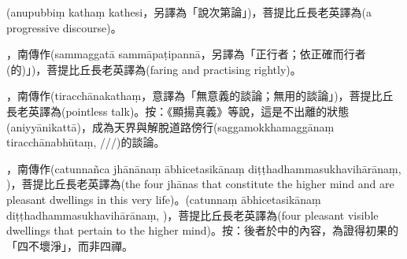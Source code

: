 \startitemgroup[noteitems]
\item{}(anupubbiṃ kathaṃ kathesi，另譯為「說次第論」)，菩提比丘長老英譯為(a progressive discourse)。
\stopitemgroup

\startitemgroup[noteitems]
\item{}，南傳作(sammaggatā sammāpaṭipannā，另譯為「正行者；依正確而行者(的)」)，菩提比丘長老英譯為(faring and practising rightly)。
\stopitemgroup

\startitemgroup[noteitems]
\item{}，南傳作(tiracchānakathaṃ，意譯為「無意義的談論；無用的談論」)，菩提比丘長老英譯為(pointless talk)。按：《顯揚真義》等說，這是不出離的狀態(aniyyānikattā)，成為天界與解脫道路傍行(saggamokkhamaggānaṃ tiracchānabhūtaṃ, ///)的談論。
\stopitemgroup

\startitemgroup[noteitems]
\item{}，南傳作(catunnañca jhānānaṃ ābhicetasikānaṃ diṭṭhadhammasukhavihārānaṃ, )，菩提比丘長老英譯為(the four jhānas that constitute the higher mind and are pleasant dwellings in this very life)。(catunnaṃ ābhicetasikānaṃ diṭṭhadhammasukhavihārānaṃ, )，菩提比丘長老英譯為(four pleasant visible dwellings that pertain to the higher mind)。按：後者於中的內容，為證得初果的「四不壞淨」，而非四禪。
\stopitemgroup

